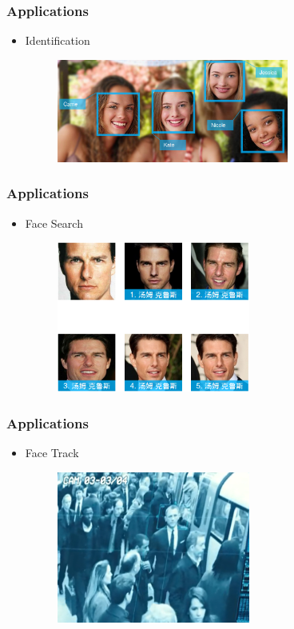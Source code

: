 \documentclass[10pt]{beamer}
\begin{document}
\begin{frame}
    \frametitle{Applications}
   \begin{itemize}
   \item Identification
   \begin{figure}[!ht]
   \centering
   \includegraphics[width=3.0in]{recognition.png}
   \end{figure}
   \end{itemize}
\end{frame}


\begin{frame}
    \frametitle{Applications}
   \begin{itemize}
   \item Face Search
   \begin{figure}[!ht]
   \centering
   \includegraphics[width=2.5in]{facesearch.png}
   \end{figure}
   \end{itemize}
\end{frame}

\begin{frame}
    \frametitle{Applications}
   \begin{itemize}
   \item Face Track
   \begin{figure}[!ht]
   \centering
   \includegraphics[width=2.5in]{video.png}
   \end{figure}
   \end{itemize}
\end{frame}
\end{document}
